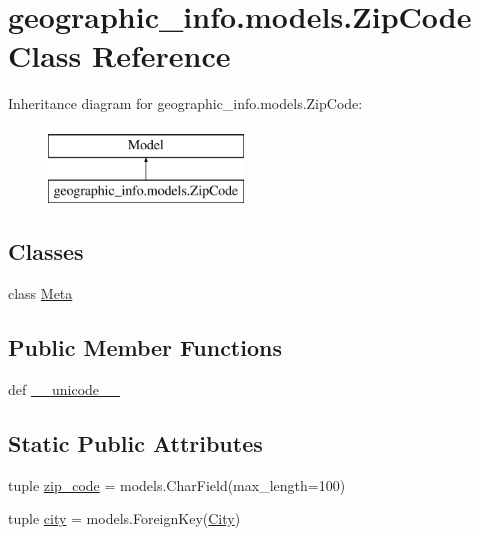 \hypertarget{classgeographic__info_1_1models_1_1_zip_code}{\section{geographic\-\_\-info.\-models.\-Zip\-Code Class Reference}
\label{classgeographic__info_1_1models_1_1_zip_code}
}
Inheritance diagram for geographic\-\_\-info.\-models.\-Zip\-Code\-:\begin{figure}[H]
\begin{center}
\leavevmode
\includegraphics[height=2.000000cm]{classgeographic__info_1_1models_1_1_zip_code}
\end{center}
\end{figure}
\subsection*{Classes}
\begin{DoxyCompactItemize}
\item 
class \hyperlink{classgeographic__info_1_1models_1_1_zip_code_1_1_meta}{Meta}
\end{DoxyCompactItemize}
\subsection*{Public Member Functions}
\begin{DoxyCompactItemize}
\item 
def \hyperlink{classgeographic__info_1_1models_1_1_zip_code_aa3d4a42d5e7fde694d35d3dfe50aa5aa}{\-\_\-\-\_\-unicode\-\_\-\-\_\-}
\end{DoxyCompactItemize}
\subsection*{Static Public Attributes}
\begin{DoxyCompactItemize}
\item 
tuple \hyperlink{classgeographic__info_1_1models_1_1_zip_code_af2ebb53df4bd914401eda2a0e316ba9c}{zip\-\_\-code} = models.\-Char\-Field(max\-\_\-length=100)
\item 
tuple \hyperlink{classgeographic__info_1_1models_1_1_zip_code_a6e2afaa7c83af5f7aa42701892aa6cfe}{city} = models.\-Foreign\-Key(\hyperlink{classgeographic__info_1_1models_1_1_city}{City})
\end{DoxyCompactItemize}


